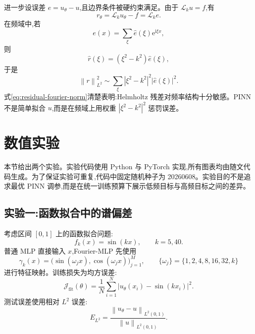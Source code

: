 \documentclass[12pt,hyperref,a4paper,UTF8,twoside]{ctexart}
\newcommand{\e}{\mathrm e}
\newcommand{\ii}{\mathrm i}
\newcommand{\calL}{\mathcal L}
\newcommand{\calJ}{\mathcal J}
\newcommand{\norm}[1]{\left\lVert #1\right\rVert}
\begin{document}
进一步设误差 $e=u_\theta-u$,且边界条件被硬约束满足。由于 $\calL_k u=f$,有
\begin{equation}\label{eq:residual-equals-error}
    r_\theta=\calL_k u_\theta-f=\calL_k e.
\end{equation}
在频域中,若
\begin{equation}\label{eq:error-fourier}
    e(x)=\sum_\xi \widehat e(\xi)\e^{\ii\xi x},
\end{equation}
则
\begin{equation}\label{eq:residual-fourier}
    \widehat r(\xi)=(\xi^2-k^2)\widehat e(\xi),
\end{equation}
于是
\begin{equation}\label{eq:residual-fourier-norm}
    \norm{r}_{L^2}^2
    \sim\sum_\xi |\xi^2-k^2|^2 |\widehat e(\xi)|^2.
\end{equation}
式\eqref{eq:residual-fourier-norm}清楚表明:Helmholtz 残差对频率结构十分敏感。PINN 不是简单拟合 $u$,而是在频域上用权重 $|\xi^2-k^2|^2$ 惩罚误差。

\section{数值实验}

本节给出两个实验。实验代码使用 Python 与 PyTorch 实现,所有图表均由随文代码生成。为了保证实验可重复,代码中固定随机种子为 20260608。实验目的不是追求最优 PINN 调参,而是在统一训练预算下展示低频目标与高频目标之间的差异。

\subsection{实验一:函数拟合中的谱偏差}

考虑区间 $[0,1]$ 上的函数拟合问题:
\begin{equation}\label{eq:fit-functions}
    f_k(x)=\sin(kx),\qquad k=5,40.
\end{equation}
普通 MLP 直接输入 $x$,Fourier-MLP 先使用
\begin{equation}\label{eq:experiment-features}
    \gamma_k(x)=\bigl(\sin(\omega_jx),\cos(\omega_jx)\bigr)_{j=1}^M,
    \qquad
    \{\omega_j\}=\{1,2,4,8,16,32,k\}
\end{equation}
进行特征映射。训练损失为均方误差:
\begin{equation}\label{eq:mse-fit}
    \calJ_{\mathrm{fit}}(\theta)=\frac1N\sum_{i=1}^N |u_\theta(x_i)-\sin(kx_i)|^2.
\end{equation}
测试误差使用相对 $L^2$ 误差:
\begin{equation}\label{eq:relative-l2}
    E_{L^2}=\frac{\norm{u_\theta-u}_{L^2(0,1)}}{\norm{u}_{L^2(0,1)}}.
\end{equation}
\end{document}
